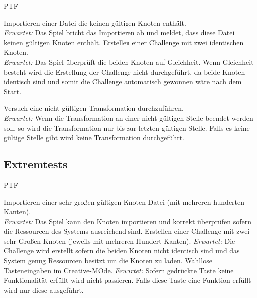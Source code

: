 \begin{ids}{\gls{PTF}}

	\id[500] Importieren einer Datei die keinen gültigen Knoten enthält.\\
	
	\textit{Erwartet:} Das Spiel bricht das Importieren ab und meldet, dass diese Datei keinen gültigen Knoten enthält.
	\id[510] Erstellen einer Challenge mit zwei identischen Knoten.\\
	\textit{Erwartet:} Das Spiel überprüft die beiden Knoten auf Gleichheit. Wenn Gleichheit besteht wird die Erstellung der Challenge nicht durchgeführt, da beide Knoten identisch sind und somit die Challenge automatisch gewonnen wäre nach dem Start.
	
	\id[520] Versuch eine nicht gültigen Transformation durchzuführen. \\
	\textit{Erwartet:} Wenn die Transformation an einer nicht gültigen Stelle beendet werden soll, so wird die Transformation nur bis zur letzten gültigen Stelle. Falls es keine gültige Stelle gibt wird keine Transformation durchgeführt.

\end{ids}


\clearpage


%
%
\subsection{Extremtests}

	\begin{ids}{\gls{PTF}}
	
		\id[1000] Importieren einer sehr großen gültigen Knoten-Datei (mit mehreren hunderten Kanten).\\
		\textit{Erwartet:} Das Spiel kann den Knoten importieren und korrekt überprüfen sofern die Ressourcen des Systems ausreichend sind.
		\id[1010] Erstellen einer Challenge mit zwei sehr Großen Knoten (jeweils mit mehreren Hundert Kanten).
		\textit{Erwartet:} Die Challenge wird erstellt sofern die beiden Knoten nicht identisch sind und das System genug Ressourcen besitzt um die Knoten zu laden.
		\id[1020] Wahllose Tasteneingaben im Creative-MOde.
		\textit{Erwartet:} Sofern gedrückte Taste keine Funktionalität erfüllt wird nicht passieren. Falls diese Taste eine Funktion erfüllt wird nur diese ausgeführt.
	
	\end{ids}




%
%
%
